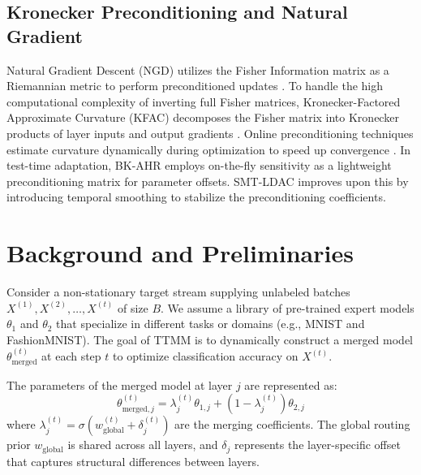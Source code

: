 \documentclass{article}
\theoremstyle{plain}
\theoremstyle{definition}
\theoremstyle{remark}
\begin{document}
\subsection{Kronecker Preconditioning and Natural Gradient}
Natural Gradient Descent (NGD) utilizes the Fisher Information matrix as a Riemannian metric to perform preconditioned updates \cite{Martens2015OptimizingNN}. To handle the high computational complexity of inverting full Fisher matrices, Kronecker-Factored Approximate Curvature (KFAC) decomposes the Fisher matrix into Kronecker products of layer inputs and output gradients \cite{Dangel2024KroneckerFactoredAC, Dangel2025KroneckerfactoredAC, Eschenhagen2023KroneckerFactoredAC}. Online preconditioning techniques estimate curvature dynamically during optimization to speed up convergence \cite{Porrello2026DatalessWD, Lee2020ContinualLW, Osawa2018LargeScaleDS, Tang2021SKFACTN, Enkhbayar2024ANW, Zhang2023KroneckerfactoredAC, Grosse2016AKA, Jamaesha2024ClusterBH, Luo2025ExplicitER, Li2024FriendlySM}. In test-time adaptation, BK-AHR employs on-the-fly sensitivity as a lightweight preconditioning matrix for parameter offsets. SMT-LDAC improves upon this by introducing temporal smoothing to stabilize the preconditioning coefficients.

\section{Background and Preliminaries}
\label{sec:background}
Consider a non-stationary target stream supplying unlabeled batches $X^{(1)}, X^{(2)}, \dots, X^{(t)}$ of size $B$. We assume a library of pre-trained expert models $\theta_1$ and $\theta_2$ that specialize in different tasks or domains (e.g., MNIST and FashionMNIST). The goal of TTMM is to dynamically construct a merged model $\theta_{\text{merged}}^{(t)}$ at each step $t$ to optimize classification accuracy on $X^{(t)}$.

The parameters of the merged model at layer $j$ are represented as:
\begin{equation}
    \theta_{\text{merged}, j}^{(t)} = \lambda_j^{(t)} \theta_{1, j} + (1 - \lambda_j^{(t)}) \theta_{2, j}
\end{equation}
where $\lambda_j^{(t)} = \sigma(w_{\text{global}}^{(t)} + \delta_j^{(t)})$ are the merging coefficients. The global routing prior $w_{\text{global}}$ is shared across all layers, and $\delta_j$ represents the layer-specific offset that captures structural differences between layers.
\end{document}
